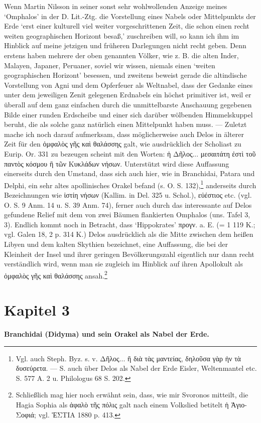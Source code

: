 \documentclass[a4paper, 11pt, oneside]{article}
\begin{document}
Wenn Martin Nilsson in seiner sonst sehr wohlwollenden Anzeige meines `Omphalos' in der D. Lit.-Ztg. die Vorstellung eines Nabels oder Mittelpunkts der Erde `erst einer kulturell viel weiter vorgeschrittenen Zeit, die schon einen recht weiten geographischen Horizont besaß,' zuschreiben will, so kann ich ihm im Hinblick auf meine jetzigen und früheren Darlegungen nicht recht geben. Denn erstens haben mehrere der oben genannten Völker, wie z. B. die alten Inder, Malayen, Japaner, Peruaner, soviel wir wissen, niemals einen `weiten geographischen Horizont' besessen, und zweitens beweist gerade die altindische Vorstellung von Agni und dem Opferfeuer als Weltnabel, dass der Gedanke eines unter dem jeweiligen Zenit gelegenen Erdnabels ein höchst primitiver ist, weil er überall auf dem ganz einfachen durch die unmittelbarste Anschauung gegebenen Bilde einer runden Erdscheibe und einer sich darüber wölbenden Himmelskuppel beruht, die als solche ganz natürlich einen Mittelpunkt haben muss. --- Zuletzt mache ich noch darauf aufmerksam, dass möglicherweise auch Delos in älterer Zeit für den ὀμφαλὸς γῆς καὶ θαλάσσης galt, wie ausdrücklich der Scholiast zu Eurip. Or. 331 zu bezeugen scheint mit den Worten: ἡ Δῆλος... μεσαιτάτη ἐστὶ τοῦ παντὸς κόσμου ἢ τῶν Κυκλάδων νήσων. Unterstützt wird diese Auffassung einerseits durch den Umstand, dass sich auch hier, wie in Branchidai, Patara und Delphi, ein sehr altes apollinisches Orakel befand (s. O. S. 132),\footnote{Vgl. auch Steph. Byz. s. v. Δῆλος... ἢ διὰ τὰς μαντείας, δηλοῦσα γὰρ ἡν τὰ δυσεύρετα. --- S. auch über Delos als Nabel der Erde Eisler, Weltenmantel etc. S. 577 A. 2 u. Philologus 68 S. 202.} anderseits durch Bezeichnungen wie ἱστίη νήσων (Kallim. in Del. 325 u. Schol.), εὐέστιος etc. (vgl. O. S. 9 Anm. 14 u. S. 39 Anm. 74), ferner auch durch das interessante auf Delos gefundene Relief mit dem von zwei Bäumen flankierten Omphalos (uns. Tafel 3, 3). Endlich kommt noch in Betracht, dass `Hippokrates' προγν. a. E. (= 1 119 K.; vgl. Galen 18, 2 p. 314 K.) Delos ausdrücklich als die Mitte zwischen dem heißen Libyen und dem kalten Skythien bezeichnet, eine Auffassung, die bei der Kleinheit der Insel und ihrer geringen Bevölkerungszahl eigentlich nur dann recht verständlich wird, wenn man sie zugleich im Hinblick auf ihren Apollokult als ὀμφαλὸς γῆς καὶ θαλάσσης ansah.\footnote{Schließlich mag hier noch erwähnt sein, dass, wie mir Svoronos mitteilt, die Hagia Sophia als ἀφαλὸ τῆς πόλις galt nach einem Volkslied betitelt ἡ Ἁγιο-Σοφιά; vgl. ἙΣΤΙΑ 1880 p. 413.}
\clearpage
\section{Kapitel 3}
\begin{center}
\textbf{Branchidai (Didyma) und sein Orakel als Nabel der Erde.}
\end{center}
\end{document}
